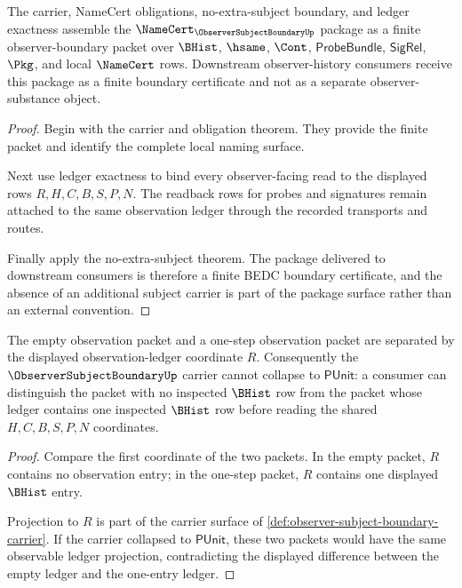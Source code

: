 \begin{theorem}
\label{thm:observer-subject-boundary-namecert-package}
The carrier, NameCert obligations, no-extra-subject boundary, and ledger exactness assemble the $\NameCert_{\ObserverSubjectBoundaryUp}$ package as a finite observer-boundary packet over $\BHist$, $\hsame$, $\Cont$, $\mathsf{ProbeBundle}$, $\mathsf{SigRel}$, $\Pkg$, and local $\NameCert$ rows. Downstream observer-history consumers receive this package as a finite boundary certificate and not as a separate observer-substance object.
\end{theorem}
\begin{proof}
Begin with the carrier and obligation theorem. They provide the finite packet and identify the complete local naming surface.

Next use ledger exactness to bind every observer-facing read to the displayed rows $R,H,C,B,S,P,N$. The readback rows for probes and signatures remain attached to the same observation ledger through the recorded transports and routes.

Finally apply the no-extra-subject theorem. The package delivered to downstream consumers is therefore a finite BEDC boundary certificate, and the absence of an additional subject carrier is part of the package surface rather than an external convention.
\end{proof}

\begin{theorem}
\label{thm:observer-subject-boundary-nontriviality-witness}
The empty observation packet and a one-step observation packet are separated by the displayed observation-ledger coordinate $R$. Consequently the $\ObserverSubjectBoundaryUp$ carrier cannot collapse to $\mathsf{PUnit}$: a consumer can distinguish the packet with no inspected $\BHist$ row from the packet whose ledger contains one inspected $\BHist$ row before reading the shared $H,C,B,S,P,N$ coordinates.
\end{theorem}
\begin{proof}
Compare the first coordinate of the two packets. In the empty packet, $R$ contains no observation entry; in the one-step packet, $R$ contains one displayed $\BHist$ entry.

Projection to $R$ is part of the carrier surface of \autoref{def:observer-subject-boundary-carrier}. If the carrier collapsed to $\mathsf{PUnit}$, these two packets would have the same observable ledger projection, contradicting the displayed difference between the empty ledger and the one-entry ledger.
\end{proof}


